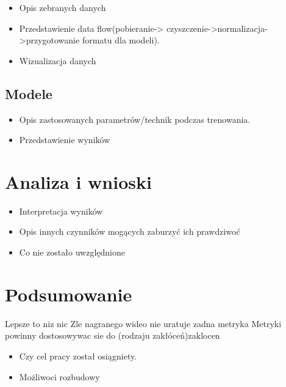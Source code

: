 \begin{itemize}

\item Opis zebranych danych
\item Przedstawienie data flow(pobieranie-> czyszczenie->normalizacja->przygotowanie formatu dla modeli).
\item Wizualizacja danych
\end{itemize}





\section{Modele }
\label{cha:drugiDokument}

\begin{itemize}
\item Opis zastosowanych parametrów/technik podczas trenowania.
\item Przedstawienie wyników 
\end{itemize}


\chapter{Analiza i wnioski }
\label{cha:drugiDokument}

\begin{itemize}
\item Interpretacja wyników
\item Opis innych czynników mogących zaburzyć ich prawdziwoć
\item Co nie zostało uwzględnione 
\end{itemize}


\chapter{Podsumowanie}
Lepsze to niz nic
Zle nagranego wideo nie uratuje zadna metryka
Metryki powinny dostosowywac sie do (rodzaju zakłóceń)zaklocen
\label{cha:pierwszyDokument}

\begin{itemize}
\item Czy cel pracy został osiągniety.
\item Możliwoci rozbudowy
\end{itemize}








